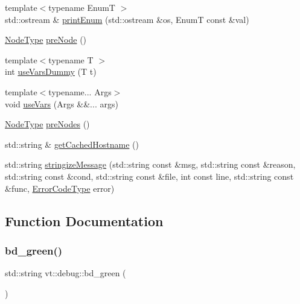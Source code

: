 \begin{DoxyCompactItemize}
{\footnotesize template$<$typename EnumT $>$ }\\std\+::ostream \& \hyperlink{namespacevt_1_1debug_afaa2c8383e718071689dfea2c959a467}{print\+Enum} (std\+::ostream \&os, EnumT const \&val)
\item 
\hyperlink{namespacevt_a866da9d0efc19c0a1ce79e9e492f47e2}{Node\+Type} \hyperlink{namespacevt_1_1debug_a0f9acc324c2b3308760aa13b29dd9736}{pre\+Node} ()
\item 
{\footnotesize template$<$typename T $>$ }\\int \hyperlink{namespacevt_1_1debug_a4417ee390fd826c2135e06abe59719dd}{use\+Vars\+Dummy} (T t)
\item 
{\footnotesize template$<$typename... Args$>$ }\\void \hyperlink{namespacevt_1_1debug_aeff93f73b5ac173a53dcf778ff771c2e}{use\+Vars} (Args \&\&... args)
\item 
\hyperlink{namespacevt_a866da9d0efc19c0a1ce79e9e492f47e2}{Node\+Type} \hyperlink{namespacevt_1_1debug_ab9a204b679ea705a255d3cb4dcce02f3}{pre\+Nodes} ()
\item 
std\+::string \& \hyperlink{namespacevt_1_1debug_a24ece85f97b2cbc60968d3cf21b36be6}{get\+Cached\+Hostname} ()
\item 
std\+::string \hyperlink{namespacevt_1_1debug_a63b47ef166cce2fe27d4fbc366a2e23c}{stringize\+Message} (std\+::string const \&msg, std\+::string const \&reason, std\+::string const \&cond, std\+::string const \&file, int const line, std\+::string const \&func, \hyperlink{namespacevt_a793764d753923abc3d32929870beb485}{Error\+Code\+Type} error)
\end{DoxyCompactItemize}


\subsection{Function Documentation}
\mbox{\label{namespacevt_1_1debug_a26f95b8d5da98fa54a335789b18fb3d3}} 
\subsubsection{\texorpdfstring{bd\+\_\+green()}{bd\_green()}}
{\footnotesize\ttfamily std\+::string vt\+::debug\+::bd\+\_\+green (\begin{DoxyParamCaption}{ }\end{DoxyParamCaption})\hspace{0.3cm}{\ttfamily [inline]}}

